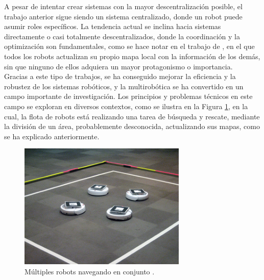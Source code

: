 A pesar de intentar crear sistemas con la mayor descentralización posible, el
trabajo anterior sigue siendo un sistema centralizado, donde un robot puede
asumir roles específicos.
La tendencia actual se inclina hacia sistemas directamente o casi totalmente
descentralizados, donde la coordinación y la optimización son fundamentales,
como se hace notar en el trabajo de \citet{Sheng2006}, en el que todos los robots
actualizan su propio mapa local con la información de los demás, sin que ninguno
de ellos adquiera un mayor protagonismo o importancia.
\\

Gracias a este tipo de trabajos, se ha conseguido mejorar la eficiencia y la
robustez de los sistemas robóticos, y la multirobótica se ha convertido en un
campo importante de investigación.
Los principios y problemas técnicos en este campo se exploran en diversos
contextos, como se ilustra en la Figura \ref{fig:multirobots}, en la cual, la
flota de robots está realizando una tarea de búsqueda y rescate, mediante la
división de un área, probablemente desconocida, actualizando sus mapas, como
se ha explicado anteriormente.

\begin{figure} [h!]
  \begin{center}
    \includegraphics[width=8cm]{figs/multirobotics_navigation}
  \end{center}
  \caption{Múltiples robots navegando en conjunto \citep{multirobot_navigation}.}
  \label{fig:multirobots}
\end{figure}\

